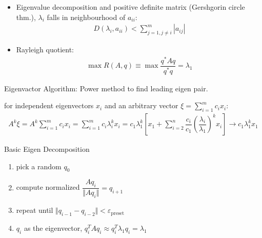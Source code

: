 \begin{itemize}[topsep=2pt,itemsep=0pt]
{    }, and such $ A+kI $), orthonormality of $ x_i\to q_i $:
    \begin{align}
        \langle q_i,q_j  \rangle =\delta_{ij}
    \end{align}
    Eigenvalue Decomposition/Spectrum Decomposition, $ X\to Q $:
    \begin{align}
        AQ=Q\Lambda \Rightarrow A=Q\Lambda Q^{-1}=Q\Lambda Q^*
    \end{align}
    \item Eigenvalue decomposition and positive definite matrix (Gershgorin circle thm.), $ \lambda _i $ falls in neighbourhood of $ a_{ii} $:
    \begin{align}
        D(\lambda_i,a_{ii})<\sum_{j=1,j\neq i}^m|a_{ij}| 
    \end{align}
    \item Rayleigh quotient:
    \begin{align}
        \max R(A,q)\equiv \max \dfrac{q^*Aq}{q^*q}=\lambda _1 
    \end{align}
    
    
        
\end{itemize}

    






Eigenvactor Algorithm: Power method to find leading eigen pair.

for independent eigenvectors $ x_i $ and an arbitrary vector $ \xi =\sum_{i=1}^mc_ix_i $:
\begin{align}
    A^k\xi =A^k\sum_{i=1}^mc_ix_i=\sum_{i=1}^mc_i\lambda_i^kx_i=c_1\lambda _1^k\left[x_1+\sum_{i=2}^n\dfrac{c_i}{c_1}\left(\dfrac{\lambda _i}{\lambda _1}\right)^kx_i\right]\to c_1\lambda _1^kx_1
\end{align}




\begin{algorithm}{Basic Eigen Decomposition}
    \begin{enumerate}[topsep=2pt,itemsep=0pt]
    \item pick a random $ q_0 $
    \item compute normalized $ \dfrac{Aq_i}{\Vert Aq_i \Vert }=q_{i+1} $
    \item repeat until $ \Vert q_{i-1}-q_{i-2} \Vert<\varepsilon_\mathrm{preset}    $
    \item $ q_i $ as the eigenvector, $ q_i^TAq_i\approx q_i^T\lambda_1 q_i=\lambda _1 $
\end{enumerate}
\end{algorithm}
    


